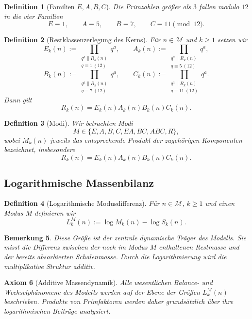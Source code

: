 \documentclass[11pt,a4paper]{article}
\newtheorem{definition}{Definition}[section]
\newtheorem{axiom}[definition]{Axiom}
\newtheorem{bemerkung}[definition]{Bemerkung}
\begin{document}
	\begin{definition}[Familien \(E,A,B,C\)]
		\label{def:modell_eabc}
		Die Primzahlen größer als \(3\) fallen modulo \(12\) in die vier Familien
		\[
		E\equiv 1,\qquad
		A\equiv 5,\qquad
		B\equiv 7,\qquad
		C\equiv 11 \pmod{12}.
		\]
	\end{definition}
	
	\begin{definition}[Restklassenzerlegung des Kerns]
		\label{def:modell_zerlegung}
		Für \(n\in\mathcal M\) und \(k\ge 1\) setzen wir
		\[
		E_k(n):=\prod_{\substack{q^a\parallel R_k(n)\\ q\equiv 1\ (12)}} q^a,\qquad
		A_k(n):=\prod_{\substack{q^a\parallel R_k(n)\\ q\equiv 5\ (12)}} q^a,
		\]
		\[
		B_k(n):=\prod_{\substack{q^a\parallel R_k(n)\\ q\equiv 7\ (12)}} q^a,\qquad
		C_k(n):=\prod_{\substack{q^a\parallel R_k(n)\\ q\equiv 11\ (12)}} q^a.
		\]
		Dann gilt
		\[
		R_k(n)=E_k(n)A_k(n)B_k(n)C_k(n).
		\]
	\end{definition}
	
	\begin{definition}[Modi]
		\label{def:modell_modi}
		Wir betrachten Modi
		\[
		M\in\{E,A,B,C,EA,BC,ABC,R\},
		\]
		wobei \(M_k(n)\) jeweils das entsprechende Produkt der zugehörigen Komponenten bezeichnet, insbesondere
		\[
		R_k(n)=E_k(n)A_k(n)B_k(n)C_k(n).
		\]
	\end{definition}
	
	\subsection{Logarithmische Massenbilanz}
	
	\begin{definition}[Logarithmische Modusdifferenz]
		\label{def:modell_lmk}
		Für \(n\in\mathcal M\), \(k\ge 1\) und einen Modus \(M\) definieren wir
		\[
		L_k^M(n):=\log M_k(n)-\log S_k(n).
		\]
	\end{definition}
	
	\begin{bemerkung}
		Diese Größe ist der zentrale dynamische Träger des Modells. Sie misst die Differenz zwischen der noch im Modus \(M\) enthaltenen Restmasse und der bereits absorbierten Schalenmasse. Durch die Logarithmierung wird die multiplikative Struktur additiv.
	\end{bemerkung}
	
	\begin{axiom}[Additive Massendynamik]
		\label{ax:additivitaet}
		Alle wesentlichen Balance- und Wechselphänomene des Modells werden auf der Ebene der Größen \(L_k^M(n)\) beschrieben. Produkte von Primfaktoren werden daher grundsätzlich über ihre logarithmischen Beiträge analysiert.
	\end{axiom}
	
\end{document}
